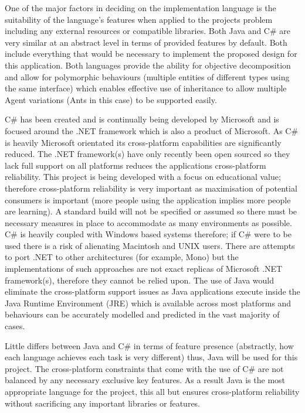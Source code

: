 One of the major factors in deciding on the implementation language is the suitability of the language’s features when applied to the projects problem including any external resources or compatible libraries. Both Java and C\# are very similar at an abstract level in terms of provided features by default. Both include everything that would be necessary to implement the proposed design for this application. Both languages provide the ability for objective decomposition and allow for polymorphic behaviours (multiple entities of different types using the same interface) which enables effective use of inheritance to allow multiple Agent variations (Ants in this case) to be supported easily. 

C\# has been created and is continually being developed by Microsoft and is focused around the .NET framework which is also a product of Microsoft. As C\# is heavily Microsoft orientated its cross-platform capabilities are significantly reduced. The .NET framework(s) have only recently been open sourced so they lack full support on all platforms reduces the applications cross-platform reliability. This project is being developed with a focus on educational value; therefore cross-platform reliability is very important as maximisation of potential consumers is important (more people using the application implies more people are learning). A standard build will not be specified or assumed so there must be necessary measures in place to accommodate as many environments as possible. C\# is heavily coupled with Windows based systems therefore; if C\# were to be used there is a risk of alienating Macintosh and UNIX users. There are attempts to port .NET to other architectures (for example, Mono\cite{mono}) but the implementations of such approaches are not exact replicas of Microsoft .NET framework(s), therefore they cannot be relied upon. The use of Java would eliminate the cross-platform support issues as Java applications execute inside the Java Runtime Environment (JRE) which is available across most platforms and behaviours can be accurately modelled and predicted in the vast majority of cases.

Little differs between Java and C\# in terms of feature presence (abstractly, how each language achieves each task is very different) thus, Java will be used for this project. The cross-platform constraints that come with the use of C\# are not balanced by any necessary exclusive key features. As a result Java is the most appropriate language for the project, this all but ensures cross-platform reliability without sacrificing any important libraries or features.

